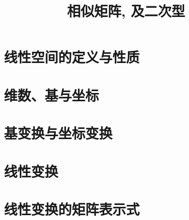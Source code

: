 \documentclass[UTF8]{ctexart}
\title{相似矩阵, 及二次型}
\begin{document}
	\tableofcontents %
	\date{} %
	\maketitle  %
	
	
	\part{线性空间的定义与性质}
	
	\part{维数、基与坐标}
	
	\part{基变换与坐标变换}
	
	\part{线性变换}
	
	\part{线性变换的矩阵表示式}


	
\end{document}
